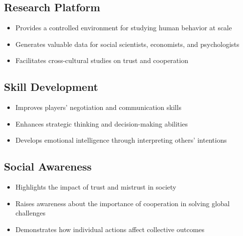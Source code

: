 \documentclass[12pt,a4paper]{article}
\begin{document}
\subsection{Research Platform}
\begin{itemize}
    \item Provides a controlled environment for studying human behavior at scale
    \item Generates valuable data for social scientists, economists, and psychologists
    \item Facilitates cross-cultural studies on trust and cooperation
\end{itemize}

\subsection{Skill Development}
\begin{itemize}
    \item Improves players' negotiation and communication skills
    \item Enhances strategic thinking and decision-making abilities
    \item Develops emotional intelligence through interpreting others' intentions
\end{itemize}

\subsection{Social Awareness}
\begin{itemize}
    \item Highlights the impact of trust and mistrust in society
    \item Raises awareness about the importance of cooperation in solving global challenges
    \item Demonstrates how individual actions affect collective outcomes
\end{itemize}
\end{document}
